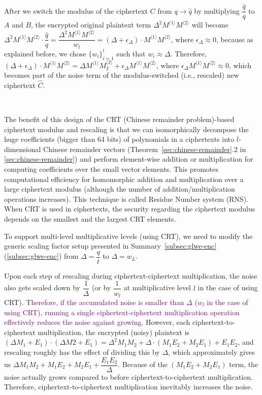 After we switch the modulus of the ciphertext $C$ from $q \rightarrow \hat{q}$ by multiplying $\dfrac{\hat{q}}{q}$ to $A$ and $B$, the encrypted original plaintext term $\Delta^2 M^{\langle 1 \rangle} M^{\langle 2 \rangle}$ will become $\Delta^2 M^{\langle 1 \rangle} M^{\langle 2 \rangle} \cdot \dfrac{\hat{q}}{q} = \dfrac{\Delta^2 M^{\langle 1 \rangle} M^{\langle 2 \rangle}}{w_l} = (\Delta + \epsilon_\Delta)\cdot M^{\langle 1 \rangle} M^{\langle 2 \rangle}$, where $\epsilon_\Delta \approx 0$, because as explained before, we chose $\{w_i\}_{i=1}^{l}$ such that $w_i \approx \Delta$. Therefore, $(\Delta + \epsilon_\Delta)\cdot M^{\langle 1 \rangle} M^{\langle 2 \rangle} = \Delta M^{\langle 1 \rangle} M_2^{\langle 2 \rangle} + \epsilon_\Delta M^{\langle 1 \rangle} M^{\langle 2 \rangle}$, where $\epsilon_\Delta M^{\langle 1 \rangle} M^{\langle 2 \rangle} \approx 0$, which becomes part of the noise term of the modulus-switched (i.e., rescaled) new ciphertext $\hat{C}$. 

$ $

The benefit of this design of the CRT (Chinese remainder problem)-based ciphertext modulus and rescaling is that we can isomorphically decompose the huge coefficients (bigger than 64 bits) of polynomials in a ciphertexts into $l$-dimensional Chinese remainder vectors (Theorem~\ref{sec:chinese-remainder}.2 in \autoref{sec:chinese-remainder}) and perform element-wise addition or multiplication for computing coefficients over the small vector elements. This promotes computational efficiency for homomorphic addition and multiplication over a large ciphertext modulus (although the number of addition/multiplication operations increases). This technique is called Residue Number system (RNS). When CRT is used in ciphertexts, the security regarding the ciphertext modulus depends on the smallest and the largest CRT elements. 

 To support multi-level multiplicative levels (using CRT), we need to modify the generic scaling factor setup presented in Summary~\ref*{subsec:glwe-enc} (\autoref{subsec:glwe-enc}) from $\Delta = \dfrac{q}{t}$ to $\Delta = w_L$. 

 Upon each step of rescaling during ciphertext-ciphertext multiplication, the noise also gets scaled down by $\dfrac{1}{\Delta}$ (or by $\dfrac{1}{w_l}$ at multiplicative level $l$ in the case of using CRT). \textcolor{purple}{Therefore, if the accumulated noise is smaller than $\Delta$ ($w_l$ in the case of using CRT), running a single ciphertext-ciphertext multiplication operation effectively reduces the noise against growing.} However, each ciphertext-to-ciphertext multiplication, the encrypted (noisy) plaintext is $(\Delta M_1 + E_1)\cdot(\Delta M2 + E_1) = \Delta^2 M_1 M_2 + \Delta\cdot (M_1E_2 + M_2E_1) + E_1E_2$, and rescaling roughly has the effect of dividing this by $\Delta$, which approximately gives us $\Delta M_1 M_2 + M_1E_2 + M_2E_1 + \dfrac{E_1E_2}{\Delta}$. Because of the $(M_1E_2 + M_2E_1)$ term, the noise actually grows compared to before ciphertext-to-ciphertext multiplication. Therefore, ciphertext-to-ciphertext multiplication inevitably increases the noise. 

